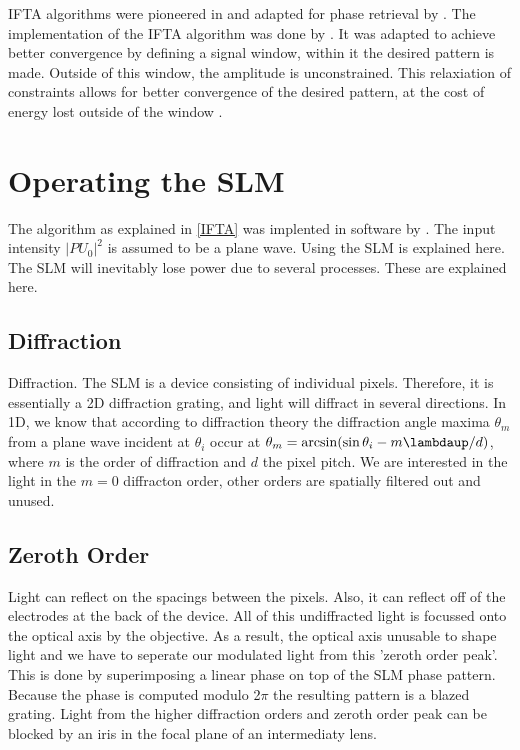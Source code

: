 IFTA algorithms were pioneered in\cite{Hirsch1971} and adapted for phase retrieval by \cite{Gerschberg1972}. The implementation of the IFTA algorithm was done by \cite{Bijnen2013,Bijnen2015}. It was adapted to achieve better convergence by defining a signal window, within it the desired pattern is made. Outside of this window, the amplitude is unconstrained. This relaxiation of constraints allows for better convergence of the desired pattern, at the cost of energy lost outside of the window \cite{Bijnen2013,Bijnen2015}.

\section{Operating the SLM}

The algorithm as explained in \cref{IFTA} was implented in software by \cite{Bijnen2015}. The input intensity $|PU_0|^2$ is assumed to be a plane wave. Using the SLM is explained here. The SLM will inevitably lose power due to several processes. These are explained here. 

\subsection{Diffraction}

Diffraction. The SLM is a device consisting of individual pixels. Therefore, it is essentially a 2D diffraction grating, and light will diffract in several directions. In 1D, we know that according to diffraction theory the diffraction angle maxima $\theta_m$ from a plane wave incident at $\theta_i$ occur at $\theta_m = \arcsin(\sin\theta_i - m\lambdaup/d)$, where $m$ is the order of diffraction and $d$ the pixel pitch. We are interested in the light in the $m=0$ diffracton order, other orders are spatially filtered out and unused.

\subsection{Zeroth Order}

Light can reflect on the spacings between the pixels. Also, it can reflect off of the electrodes at the back of the device. All of this undiffracted light is focussed onto the optical axis by the objective. As a result, the optical axis unusable to shape light and we have to seperate our modulated light from this 'zeroth order peak'. This is done by superimposing a linear phase on top of the SLM phase pattern. Because the phase is computed modulo 2$\pi$ the resulting pattern is a blazed grating. Light from the higher diffraction orders and zeroth order peak can be blocked by an iris in the focal plane of an intermediaty lens. 
    
